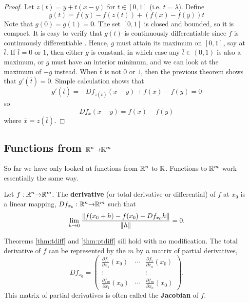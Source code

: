 \begin{proof}
  Let $z(t) = y + t(x-y)$ for $t \in [0,1]$ (i.e.
  $t=\lambda$). Define
  \[ g(t) = f(y) - f(z(t)) + \left(f(x) - f(y)\right) t \] Note that
  $g(0) = g(1) = 0$. The set $[0,1]$ is closed and bounded, so it is
  compact. It is easy to verify that $g(t)$ is continuously
  differentiable since $f$ is continuously differentiable . Hence, $g$
  must attain its maximum on $[0,1]$, say at $\bar{t}$. If $\bar{t} =
  0$ or $1$, then either $g$ is constant, in which case any $\bar{t}
  \in (0,1)$ is also a maximum, or $g$ must have an interior minimum,
  and we can look at the maximum of $-g$ instead. When $\bar{t}$ is
  not $0$ or $1$, then the previous theorem shows that $g'(\bar{t}) =
  0$. Simple calculation shows that
  \[ g'(\bar{t}) = -Df_{z(\bar{t})} (x-y) +  f(x) - f(y) = 0 \]
  so 
  \[ Df_{\bar{x}}(x-y) = f(x) - f(y) \]
  where $\bar{x} = z(\bar{t})$.
\end{proof}

\subsection{Functions from $\mathbb{R}^n {\rightarrow} \mathbb{R}^m$}

So far we have only looked at functions from $\mathbb{R}^n$ to $\mathbb{R}$. Functions
to $\mathbb{R}^m$ work essentially the same way. 
\begin{definition}
  Let $f: \mathbb{R}^n {\rightarrow} \mathbb{R}^m$. The \textbf{derivative} (or total derivative
  or differential) of $f$ at $x_0$ is a linear mapping, $Df_{x_0}:
  \mathbb{R}^n {\rightarrow} \mathbb{R}^m$ such that
  \begin{align*}
    \lim_{h {\rightarrow} 0} \frac{\left\Vert f(x_0 + h) - f(x_0) - Df_{x_0}
        h\right\Vert} {\left\Vert {h} \right\Vert} = 0. 
  \end{align*}
\end{definition}
Theorems \ref{thm:tdiff} and \ref{thm:ptdiff} sill hold with no
modification. The total derivative of $f$ can be represented by the
$m$ by $n$ matrix of partial derivatives,
\[ Df_{x_0}  = \begin{pmatrix} \frac{\partial f_1}{\partial x_1}(x_0) &
  \cdots & \frac{\partial f_1}{\partial x_n}(x_0) \\
  \vdots & & \vdots \\
  \frac{\partial f_m}{\partial x_1}(x_0) & \cdots & \frac{\partial
    f_m}{\partial x_n}(x_0)  
\end{pmatrix}. \] 
This matrix of partial derivatives is often called
the \textbf{Jacobian} of $f$. 

